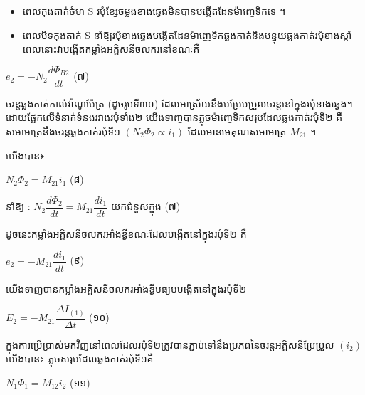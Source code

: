 \vspace{0.5em}
\noindent
\begin{minipage}[t]{0.45\textwidth}
	\vspace{0pt}
\end{minipage}%
\hfill
\begin{minipage}[t]{0.52\textwidth}
	\vspace{0pt}
	\begin{itemize}[itemsep=2pt, topsep=4pt, parsep=0pt, leftmargin=1.6em]
		\item ពេលកុងតាក់ចំហ S របុំខ្សែចម្លងខាងឆ្វេងមិនបានបង្កើតដែនម៉ាញេទិកទេ ។
		\item ពេលបិទកុងតាក់ S នាំឱ្យរបុំខាងឆ្វេងបង្កើតដែនម៉ាញេទិកឆ្លងកាត់និងបន្ធុយឆ្លងកាត់របុំខាងស្តាំ ពេលនោះវាបង្កើតកម្លាំងអគ្គិសនីចលករនៅខណៈគឺ
	\end{itemize}

	\begin{center}
		$\boxed{e_2 = -N_2 \dfrac{d\Phi_{B2}}{dt}}$ \quad (៧)
	\end{center}
\end{minipage}

\vspace{0.7em}
\noindent
ចរន្តឆ្លងកាត់កាល់វ៉ាណូម៉ែត្រ (ដូចរូបទី៣០) ដែលអាស្រ័យនឹងបម្រែបម្រួលចរន្តនៅក្នុងរបុំខាងឆ្វេង។ ដោយផ្អែកលើទំនាក់ទំនងរវាងរបុំទាំង២ យើងទាញបានភ្លុចម៉ាញេទិកសរុបដែលឆ្លងកាត់របុំទី២ គឺសមាមាត្រនឹងចរន្តឆ្លងកាត់របុំទី១ $(N_2\Phi_2 \propto i_1)$ ដែលមានមេគុណសមាមាត្រ $M_{21}$ ។

យើងបាន៖
\begin{center}
	$\boxed{N_2\Phi_2 = M_{21}i_1}$ \quad (៨)
\end{center}

នាំឱ្យ : $N_2 \dfrac{d\Phi_2}{dt} = M_{21} \dfrac{di_1}{dt}$ \quad យកជំនួសក្នុង (៧)

ដូចនេះកម្លាំងអគ្គិសនីចលករអាំងឌ្វីខណៈដែលបង្កើតនៅក្នុងរបុំទី២ គឺ
\begin{center}
	$\boxed{e_2 = -M_{21} \dfrac{di_1}{dt}}$ \quad (៩)
\end{center}

យើងទាញបានកម្លាំងអគ្គិសនីចលករអាំងឌ្វីមធ្យមបង្កើតនៅក្នុងរបុំទី២
\begin{center}
	$\boxed{E_2 = -M_{21} \dfrac{\Delta I_{(1)}}{\Delta t}}$ \quad (១០)
\end{center}

ក្នុងការប្រើប្រាស់មកវិញនៅពេលដែលរបុំទី២ត្រូវបានភ្ជាប់ទៅនឹងប្រភពនៃចរន្តអគ្គិសនីប្រែប្រួល $(i_2)$ យើងបាន៖ ភ្លុចសរុបដែលឆ្លងកាត់របុំទី១គឺ
\begin{center}
	$N_1\Phi_1 = M_{12}i_2$ \quad (១១)
\end{center}

